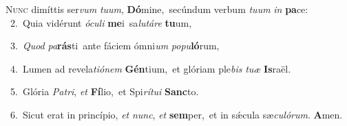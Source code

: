\lettrine{\initial\textcolor{\initialcolor}{N}}{unc} dimíttis ser\textit{vum} \textit{tu}\-\textit{um}, \textbf{Dó}\-mine,~\star secúndum verbum \textit{tu}\-\textit{um} \textit{in} \textbf{pa}\-ce:\\
{\numbfont\textcolor{\numbcolor}{~2.}}~Quia vidérunt \textit{ó}\-\textit{cu}\textit{li} \textbf{me}\-i~\star sa\-\textit{lu}\-\textit{tá}\textit{re} \textbf{tu}\-um,\par
{\numbfont\textcolor{\numbcolor}{~3.}}~\textit{Quod} \textit{pa}\-\textbf{rás}ti~\star ante fáciem ómni\textit{um} \textit{po}\-\textit{pu}\textbf{ló}rum,\par
{\numbfont\textcolor{\numbcolor}{~4.}}~Lumen ad revela\-\textit{ti}\-\textit{ó}\textit{nem} \textbf{Gén}\-tium,~\star et glóriam ple\textit{bis} \textit{tu}\-\textit{æ} \textbf{Is}\-raël.\par
{\numbfont\textcolor{\numbcolor}{~5.}}~Glória \textit{Pa}\-\textit{tri}, \textit{et} \textbf{Fí}\-lio,~\star et Spi\-\textit{rí}\-\textit{tu}\textit{i} \textbf{Sanc}\-to.\par
{\numbfont\textcolor{\numbcolor}{~6.}}~Sicut erat in princípio, \textit{et} \textit{nunc}\-, \textit{et} \textbf{sem}\-per,~\star et in sǽcula sæ\-\textit{cu}\-\textit{ló}\textit{rum}. \textbf{A}\-men.\par
